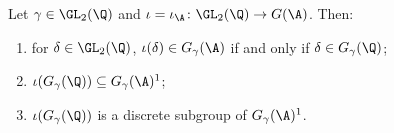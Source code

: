 Let $\gamma\in\GL_2(\Q)$ and $\iota=\iota_\A\colon\GL_2(\Q)\to G(\A)$. Then:
\begin{enumerate}
  \item[(a)] for $\delta\in\GL_2(\Q)$, $\iota(\delta)\in G_\gamma(\A)$ if and only if $\delta\in G_\gamma(\Q)$;
  \item[(b)] $\iota(G_\gamma(\Q))\subseteq G_\gamma(\A)^1$;
  \item[(c)] $\iota(G_\gamma(\Q))$ is a discrete subgroup of $G_\gamma(\A)^1$.
\end{enumerate}
